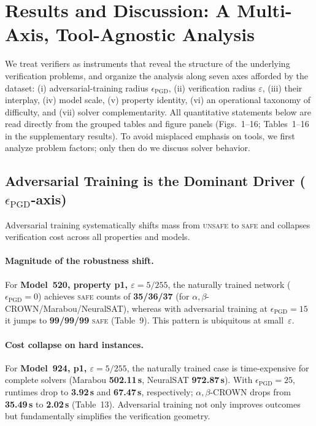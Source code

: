 \section{Results and Discussion: A Multi-Axis, Tool-Agnostic Analysis}
\label{sec:results}

We treat verifiers as instruments that reveal the structure of the underlying verification problems, and organize the analysis along seven axes afforded by the dataset: (i) adversarial-training radius $\epsilon_{\mathrm{PGD}}$, (ii) verification radius $\varepsilon$, (iii) their interplay, (iv) model scale, (v) property identity, (vi) an operational taxonomy of difficulty, and (vii) solver complementarity. All quantitative statements below are read directly from the grouped tables and figure panels (Figs.~1--16; Tables~1--16 in the supplementary results). To avoid misplaced emphasis on tools, we first analyze problem factors; only then do we discuss solver behavior.

\subsection{Adversarial Training is the Dominant Driver ($\epsilon_{\mathrm{PGD}}$-axis)}
Adversarial training systematically shifts mass from \textsc{unsafe} to \textsc{safe} and collapses verification cost across all properties and models.

\paragraph{Magnitude of the robustness shift.}
For \textbf{Model~520, property p1, $\varepsilon=5/255$}, the naturally trained network ($\epsilon_{\mathrm{PGD}}{=}0$) achieves \textsc{safe} counts of \textbf{35/36/37} (for $\alpha,\beta$-CROWN/Marabou/NeuralSAT), whereas with adversarial training at $\epsilon_{\mathrm{PGD}}{=}15$ it jumps to \textbf{99/99/99} \textsc{safe} (Table~9). This pattern is ubiquitous at small~$\varepsilon$.

\paragraph{Cost collapse on hard instances.}
For \textbf{Model~924, p1, $\varepsilon=5/255$}, the naturally trained case is time-expensive for complete solvers (Marabou \textbf{502.11\,s}, NeuralSAT \textbf{972.87\,s}). With $\epsilon_{\mathrm{PGD}}{=}25$, runtimes drop to \textbf{3.92\,s} and \textbf{67.47\,s}, respectively; $\alpha,\beta$-CROWN drops from \textbf{35.49\,s} to \textbf{2.02\,s} (Table~13). Adversarial training not only improves outcomes but fundamentally simplifies the verification geometry.


